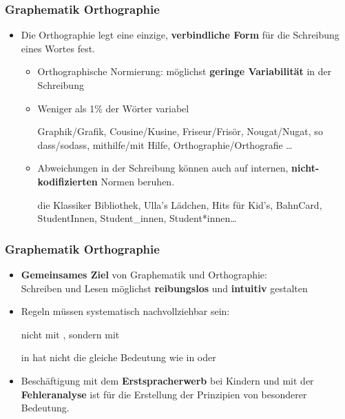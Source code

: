 \begin{frame}
\frametitle{Graphematik \vs Orthographie}

\begin{itemize}
	\item Die Orthographie legt \idR eine einzige, \textbf{verbindliche Form} für die Schreibung eines Wortes fest.
	
	\begin{itemize}
		\item Orthographische Normierung: möglichst \textbf{geringe Variabilität} in der Schreibung

\pause

		\item Weniger als 1\% der Wörter variabel
			
		\ea Graphik/Grafik, Cousine/Kusine, Friseur/Frisör, Nougat/Nugat, so dass/sodass, mithilfe/mit Hilfe, Orthographie/Orthografie \dots
		\z

\pause 
			
		\item Abweichungen in der Schreibung können auch auf internen, \textbf{nicht-kodifizierten} Normen beruhen.
			
		\ea die Klassiker Bibliothek, Ulla's Lädchen, Hits für Kid's, BahnCard, StudentInnen, Student\_innen, Student*innen\dots
		\z
	\end{itemize}
\end{itemize}

\end{frame}


\begin{frame}
\frametitle{Graphematik \vs Orthographie}

\begin{itemize}
	\item \textbf{Gemeinsames Ziel} von Graphematik und Orthographie:\\
	 Schreiben und Lesen möglichst \textbf{reibungslos} und \textbf{intuitiv} gestalten

	\item Regeln müssen systematisch nachvollziehbar sein:
	
	\ea {} nicht mit , sondern mit  
	
	 in  hat nicht die gleiche Bedeutung wie  in  oder 
	\z
	
	\item Beschäftigung mit dem \textbf{Erstspracherwerb} bei Kindern und mit der \textbf{Fehleranalyse} ist für die Erstellung der Prinzipien von besonderer Bedeutung.
\end{itemize}

\end{frame}


